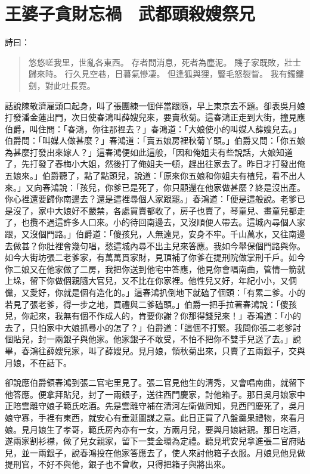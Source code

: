 
\chapter{王婆子貪財忘禍　武都頭殺嫂祭兄}

詩曰：
\begin{quote}
悠悠嗟我里，世亂各東西。
存者問消息，死者為塵泥。
賤子家既敗，壯士歸來時。
行久見空巷，日暮氣慘凄。
但逢狐與狸，豎毛怒裂眥。
我有鐲鏤劍，對此吐長霓。
\end{quote}

話說陳敬濟雇頭口起身，叫了張團練一個伴當跟隨，早上東京去不題。卻表吳月娘打發潘金蓮出門，次日使春鴻叫薛嫂兒來，要賣秋菊。這春鴻正走到大街，撞見應伯爵，叫住問：「春鴻，你往那裡去？」春鴻道：「大娘使小的叫媒人薛嫂兒去。」伯爵問：「叫媒人做甚麼？」春鴻道：「賣五娘房裡秋菊丫頭。」伯爵又問：「你五娘為甚麼打發出來嫁人？」這春鴻便如此這般，「因和俺姐夫有些說話，大娘知道了，先打發了春梅小大姐，然後打了俺姐夫一頓，趕出往家去了。昨日才打發出俺五娘來。」伯爵聽了，點了點頭兒，說道：「原來你五娘和你姐夫有楂兒，看不出人來。」又向春鴻說：「孩兒，你爹已是死了，你只顧還在他家做甚麼？終是沒出產。你心裡還要歸你南邊去？還是這裡尋個人家跟罷。」春鴻道：「便是這般說。老爹已是沒了，家中大娘好不嚴禁，各處買賣都收了，房子也賣了，琴童兒、畫童兒都走了，也攬不過這許多人口來。小的待回南邊去，又沒順便人帶去。這城內尋個人家跟，又沒個門路。」伯爵道：「傻孩兒，人無遠見，安身不牢。千山萬水，又往南邊去做甚？你肚裡會幾句唱，愁這城內尋不出主兒來答應。我如今舉保個門路與你。如今大街坊張二老爹家，有萬萬貫家財，見頂補了你爹在提刑院做掌刑千戶。如今你二娘又在他家做了二房，我把你送到他宅中答應，他見你會唱南曲，管情一箭就上垛，留下你做個親隨大官兒，又不比在你家裡。他性兒又好，年紀小小，又倜儻，又愛好，你就是個有造化的。」這春鴻扒倒地下就磕了個頭：「有累二爹。小的若見了張老爹，得一步之地，買禮與二爹磕頭。」伯爵一把手拉著春鴻說：「傻孩兒，你起來，我無有個不作成人的，肯要你謝？你那得錢兒來！」春鴻道：「小的去了，只怕家中大娘抓尋小的怎了？」伯爵道：「這個不打緊。我問你張二老爹討個貼兒，封一兩銀子與他家。他家銀子不敢受，不怕不把你不雙手兒送了去。」說畢，春鴻往薛嫂兒家，叫了薛嫂兒。見月娘，領秋菊出來，只賣了五兩銀子，交與月娘，不在話下。

卻說應伯爵領春鴻到張二官宅里見了。張二官見他生的清秀，又會唱南曲，就留下他答應。便拿拜貼兒，封了一兩銀子，送往西門慶家，討他箱子。那日吳月娘家中正陪雲離守娘子範氏吃酒。先是雲離守補在清河左衛做同知，見西門慶死了，吳月娘守寡，手裡有東西，就安心有垂涎圖謀之意。此日正買了八盤羹果禮物，來看月娘。見月娘生了孝哥，範氏房內亦有一女，方兩月兒，要與月娘結親。那日吃酒，遂兩家割衫襟，做了兒女親家，留下一雙金環為定禮。聽見玳安兒拿進張二官府貼兒，並一兩銀子，說春鴻投在他家答應去了，使人來討他箱子衣服。月娘見他見做提刑官，不好不與他，銀子也不曾收，只得把箱子與將出來。

